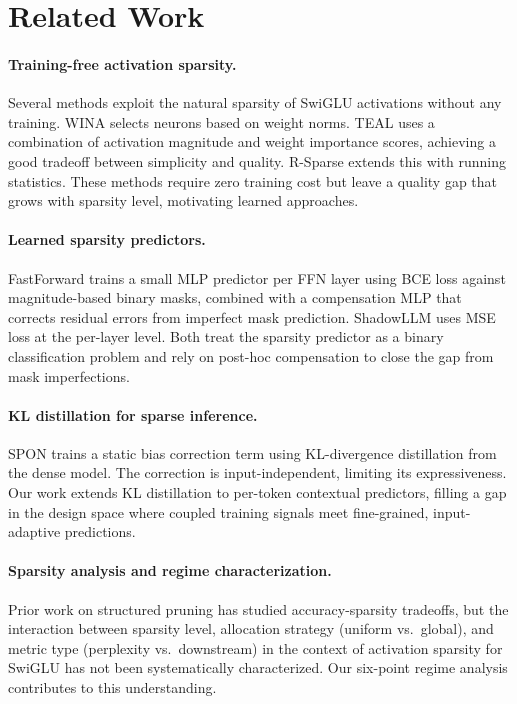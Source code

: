 \documentclass[11pt,a4paper]{article}
\begin{document}
\section{Related Work}
\label{sec:related}

\paragraph{Training-free activation sparsity.}
Several methods exploit the natural sparsity of SwiGLU activations without any training. WINA selects neurons based on weight norms. TEAL uses a combination of activation magnitude and weight importance scores, achieving a good tradeoff between simplicity and quality. R-Sparse extends this with running statistics. These methods require zero training cost but leave a quality gap that grows with sparsity level, motivating learned approaches.

\paragraph{Learned sparsity predictors.}
FastForward trains a small MLP predictor per FFN layer using BCE loss against magnitude-based binary masks, combined with a compensation MLP that corrects residual errors from imperfect mask prediction. ShadowLLM uses MSE loss at the per-layer level. Both treat the sparsity predictor as a binary classification problem and rely on post-hoc compensation to close the gap from mask imperfections.

\paragraph{KL distillation for sparse inference.}
SPON trains a static bias correction term using KL-divergence distillation from the dense model. The correction is input-independent, limiting its expressiveness. Our work extends KL distillation to per-token contextual predictors, filling a gap in the design space where coupled training signals meet fine-grained, input-adaptive predictions.

\paragraph{Sparsity analysis and regime characterization.}
Prior work on structured pruning has studied accuracy-sparsity tradeoffs, but the interaction between sparsity level, allocation strategy (uniform vs.\ global), and metric type (perplexity vs.\ downstream) in the context of activation sparsity for SwiGLU has not been systematically characterized. Our six-point regime analysis contributes to this understanding.
\end{document}
